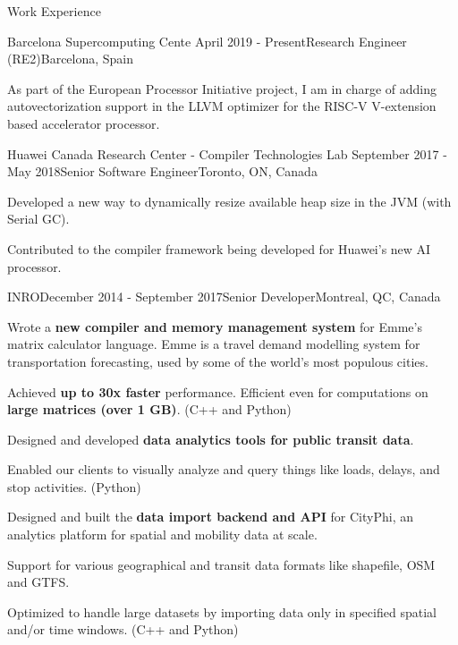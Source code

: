 \documentclass{resume} %
\begin{document}
\begin{rSection}{Work Experience}

\begin{rSubsection}{Barcelona Supercomputing Cente}
	{April 2019 - Present}{Research Engineer (RE2)}{Barcelona, Spain}
\item As part of the European Processor Initiative project, I am in charge of
	adding autovectorization support in the LLVM optimizer for the
	RISC-V V-extension based accelerator processor.
\end{rSubsection}

\begin{rSubsection}{Huawei Canada Research Center - Compiler Technologies Lab}
	{September 2017 - May 2018}{Senior Software Engineer}{Toronto, ON, Canada}
\item Developed a new way to dynamically resize available heap size in the JVM (with Serial GC).
\item Contributed to the compiler framework being developed for Huawei's new AI processor.
\end{rSubsection}

\begin{rSubsection}{INRO}{December 2014 - September 2017}{Senior Developer}{Montreal,
        QC, Canada}
\item Wrote a \textbf{new compiler and memory management system} for Emme's
        matrix calculator language. Emme is a travel demand modelling system
        for transportation forecasting, used by some of the world's most
        populous cities.
\begin{lsubSubsection} 
\item Achieved \textbf{up to 30x faster} performance. Efficient even for
        computations on \textbf{large matrices (over 1 GB)}. (C++ and Python)
\end{lsubSubsection}
\item Designed and developed \textbf{data analytics tools for public transit
        data}.
\begin{lsubSubsection}
\item Enabled our clients to visually analyze and query things like
        loads, delays, and stop activities. (Python)
\end{lsubSubsection}
\item Designed and built the \textbf{data import backend and API} for CityPhi,
        an analytics platform for spatial and mobility data at scale.
\begin{lsubSubsection}
\item Support for various geographical and transit data formats like shapefile,
        OSM and GTFS.
\item Optimized to handle large datasets by importing data only in specified
        spatial and/or time windows. (C++ and Python)
\end{lsubSubsection}
\end{rSubsection}


\end{rSection}
\end{document}
